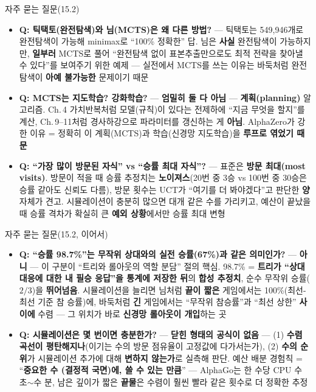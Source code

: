 \documentclass[aspectratio=169,11pt]{beamer}
\begin{document}
\begin{frame}{자주 묻는 질문(15.2)}
  \small
  \begin{itemize}
    \item \textbf{Q: 틱택토(완전탐색)와 님(MCTS)은 왜 다른
      방법?} --- 틱택토는 549,946개로 완전탐색이 가능해
      minimax로 ``100\% 정확한'' 답. 님은 \textbf{사실}
      완전탐색이 가능하지만, \textbf{일부러} MCTS로 풀어
      ``완전탐색 없이 표본추출만으로도 최적 전략을 찾아낼 수
      있다''를 보여주기 위한 예제 --- 실전에서 MCTS를 쓰는
      이유는 바둑처럼 완전탐색이 \textbf{아예 불가능한}
      문제이기 때문
    \item \textbf{Q: MCTS는 지도학습? 강화학습?} --- \textbf{엄밀히
      둘 다 아님} --- \textbf{계획(planning)} 알고리즘.
      Ch.\,4 가치반복처럼 모델(규칙)이 있다는 전제하에
      ``지금 무엇을 할지''를 계산, Ch.\,9--11처럼 경사하강으로
      파라미터를 갱신하는 게 \textbf{아님}. AlphaZero가
      강한 이유 = 정확히 이 계획(MCTS)과 학습(신경망
      지도학습)을 \textbf{루프로 엮었기 때문}
    \item \textbf{Q: ``가장 많이 방문된 자식'' vs ``승률 최대
      자식''?} --- 표준은 \textbf{방문 최대(most visits)}.
      방문이 적을 때 승률 추정치는 \textbf{노이져스}(20번 중
      3승 vs 100번 중 30승은 승률 같아도 신뢰도 다름),
      방문 횟수는 UCT가 ``여기를 더 봐야겠다''고 판단한
      \textbf{양} 자체가 견고. 시뮬레이션이 충분히 많으면
      대개 같은 수를 가리키고, 예산이 끝났을 때 승률 격차가
      확실히 큰 \textbf{예외 상황}에서만 승률 최대 변형
  \end{itemize}
\end{frame}

\begin{frame}{자주 묻는 질문(15.2, 이어서)}
  \small
  \begin{itemize}
    \item \textbf{Q: ``승률 98.7\%''는 무작위 상대와의 실전
      승률(67\%)과 같은 의미인가?} --- \textbf{아니} --- 이
      구분이 ``트리와 롤아웃의 역할 분담'' 절의 핵심.
      98.7\% = \textbf{트리가 ``상대 대응에 대한 내 필승
      응답''을 통계에 저장한 뒤}의 \textbf{합성 추정치},
      순수 무작위 승률($2/3$)을 \textbf{뛰어넘음}.
      시뮬레이션을 늘리면 님처럼 \textbf{끝이 짧은} 게임에서는
      100\%(최선-최선 기준 참 승률)에, 바둑처럼 \textbf{긴}
      게임에서는 ``무작위 참승률''과 ``최선 상한''
      \textbf{사이에} 수렴 --- 그 위치가 바로 \textbf{신경망
      롤아웃이 개입}하는 곳
    \item \textbf{Q: 시뮬레이션은 몇 번이면 충분한가?} ---
      \textbf{닫힌 형태의 공식이 없음} ---
      (1) \textbf{수렴 곡선이 평탄해지나}(이기는 수의 방문
      점유율이 고정값에 다가서는가), (2) \textbf{수의 순위}가
      시뮬레이션 추가에 대해 \textbf{변하지 않는가}로
      실측해 판단. 예산 배분 경험칙 = ``\textbf{중요한 수
      (결정적 국면)에, 쓸 수 있는 만큼}'' --- AlphaGo는 한
      수당 CPU 수 초$\sim$수 분, 남은 깊이가 짧은 \textbf{끝물}은
      수렴이 훨씬 빨라 같은 횟수로 더 정확한 추정
  \end{itemize}
\end{frame}
\end{document}
